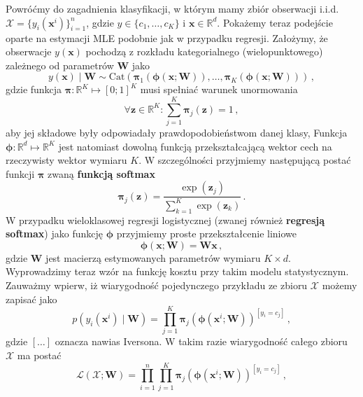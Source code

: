 \documentclass{myclass}
\numberwithin{equation}{section}
\begin{document}
Powróćmy do zagadnienia klasyfikacji, w którym mamy zbiór obserwacji i.i.d. \(\mathcal{X} =
\{y_i(\mathbf{x}^i)\}_{i=1}^n\), gdzie \(y \in \{c_1,\ldots,c_K\}\) i \(\mathbf{x} \in
\mathbb{R}^d\). Pokażemy teraz podejście oparte na estymacji MLE podobnie jak w przypadku regresji.
Założymy, że obserwacje \(y(\mathbf{x})\) pochodzą z rozkładu kategorialnego (wielopunktowego)
zależnego od parametrów \(\mathbf{W}\) jako
\begin{equation}
    y(\mathbf{x}) \mid \mathbf{W} \sim \mathrm{Cat}(\boldsymbol{\pi}_1(\boldsymbol{\phi}(\mathbf{x}; \mathbf{W})), \ldots, \boldsymbol{\pi}_K(\boldsymbol{\phi}(\mathbf{x}; \mathbf{W})))\,,
\end{equation}
gdzie funkcja \(\boldsymbol{\pi}: \mathbb{R}^K \mapsto [0;1]^K\) musi spełniać warunek unormowania
\begin{equation*}
    \forall \mathbf{z}\in\mathbb{R}^K: \sum_{j=1}^K \boldsymbol{\pi}_j(\mathbf{z}) = 1\,,
\end{equation*}
aby jej składowe były odpowiadały prawdopodobieństwom danej klasy, Funkcja \(\boldsymbol{\phi}:
\mathbb{R}^d \mapsto \mathbb{R}^K\) jest natomiast dowolną funkcją przekształcającą wektor cech na
rzeczywisty wektor wymiaru \(K\). W szczególności przyjmiemy następującą postać funkcji
\(\boldsymbol{\pi}\) zwaną \textbf{funkcją softmax}
\begin{equation}\boxed{
    \boldsymbol{\pi}_j(\mathbf{z}) = \frac{\exp\left(\mathbf{z}_j\right)}{\sum_{k=1}^K \exp\left(\mathbf{z}_k\right)}\,.
}\end{equation}
W przypadku wieloklasowej regresji logistycznej (zwanej również \textbf{regresją softmax}) jako
funkcję \(\boldsymbol{\phi}\) przyjmiemy proste przekształcenie liniowe
\begin{equation}
    \boldsymbol{\phi}(\mathbf{x}; \mathbf{W}) = \mathbf{W}\mathbf{x}\,,
\end{equation} 
gdzie \(\mathbf{W}\) jest macierzą estymowanych parametrów wymiaru \(K \times d\). Wyprowadzimy
teraz wzór na funkcję kosztu przy takim modelu statystycznym. Zauważmy wpierw, iż wiarygodność
pojedynczego przykładu ze zbioru \(\mathcal{X}\) możemy zapisać jako
\begin{equation}
    p(y_i(\mathbf{x}^i) \mid \mathbf{W}) = \prod_{j=1}^K \boldsymbol{\pi}_j\left(\boldsymbol{\phi}(\mathbf{x}^i; \mathbf{W})\right)^{[y_i = c_j]}\,,
\end{equation}
gdzie \([\ldots]\) oznacza nawias Iversona. W takim razie wiarygodność całego zbioru \(\mathcal{X}\)
ma postać
\begin{equation}
    \mathcal{L}(\mathcal{X}; \mathbf{W}) = \prod_{i=1}^n \prod_{j=1}^K \boldsymbol{\pi}_j\left(\boldsymbol{\phi}(\mathbf{x}^i; \mathbf{W})\right)^{[y_i = c_j]}\,,
\end{equation}
\end{document}

